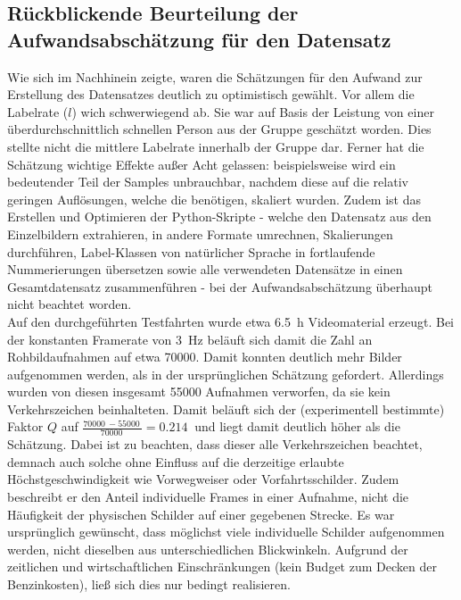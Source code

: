 \subsection{Rückblickende Beurteilung der Aufwandsabschätzung für den Datensatz}
Wie sich im Nachhinein zeigte, waren die Schätzungen für den Aufwand zur Erstellung des Datensatzes deutlich zu optimistisch gewählt. Vor allem die Labelrate ($l$) wich schwerwiegend ab. Sie war auf Basis der Leistung von einer überdurchschnittlich schnellen Person aus der Gruppe geschätzt worden. Dies stellte nicht die mittlere Labelrate innerhalb der Gruppe dar. Ferner hat die Schätzung wichtige Effekte außer Acht gelassen: beispielsweise wird ein bedeutender Teil der Samples unbrauchbar, nachdem diese auf die relativ geringen Auflösungen, welche die  benötigen, skaliert wurden. Zudem ist das Erstellen und Optimieren der Python-Skripte - welche den Datensatz aus den Einzelbildern extrahieren, in andere Formate umrechnen, Skalierungen durchführen, Label-Klassen von natürlicher Sprache in fortlaufende Nummerierungen übersetzen sowie alle verwendeten Datensätze in einen Gesamtdatensatz zusammenführen - bei der Aufwandsabschätzung überhaupt nicht beachtet worden.\\

Auf den durchgeführten Testfahrten wurde etwa \SI{6.5}{\hour} Videomaterial erzeugt. Bei der konstanten Framerate von \SI{3}{\hertz} beläuft sich damit die Zahl an Rohbildaufnahmen auf etwa \SI{70000}{}. Damit konnten deutlich mehr Bilder aufgenommen werden, als in der ursprünglichen Schätzung gefordert. Allerdings wurden von diesen insgesamt \SI{55000}{} Aufnahmen verworfen, da sie kein Verkehrszeichen beinhalteten. Damit beläuft sich der (experimentell bestimmte) Faktor $Q$ auf $\frac{\SI{70000}{} - \SI{55000}{}}{\SI{70000}{}} = \SI{0.214}{}$ und liegt damit deutlich höher als die Schätzung. Dabei ist zu beachten, dass dieser alle Verkehrszeichen beachtet, demnach auch solche ohne Einfluss auf die derzeitige erlaubte Höchstgeschwindigkeit wie Vorwegweiser oder Vorfahrtsschilder. Zudem beschreibt er den Anteil individuelle Frames in einer Aufnahme, nicht die Häufigkeit der physischen Schilder auf einer gegebenen Strecke. Es war ursprünglich gewünscht, dass möglichst viele individuelle Schilder aufgenommen werden, nicht dieselben aus unterschiedlichen Blickwinkeln. Aufgrund der zeitlichen und wirtschaftlichen Einschränkungen (kein Budget zum Decken der Benzinkosten), ließ sich dies nur bedingt realisieren.\\

